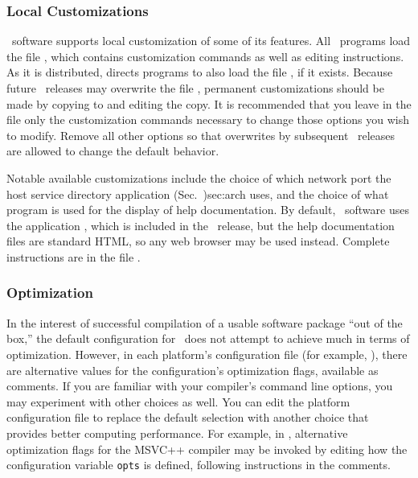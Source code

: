 \subsubsection{Local Customizations}\label{sec:custom}

\OOMMF\ software supports local customization of some of its
features.  All \OOMMF\ programs load the file
, which
contains customization commands as well as editing instructions.  As it
is distributed,  directs programs to also load
the file , if it exists.  Because future
\OOMMF\ releases may overwrite the file
, permanent customizations should be made by
copying  to  and
editing the copy.  It is recommended that you leave in the file
 only the customization commands necessary
to change those options you wish to modify.  Remove all other options so
that overwrites by subsequent \OOMMF\ releases are allowed to change the
default behavior.

Notable available customizations include the choice of which network
port the  {host service
directory application (Sec.~}{)}{sec:arch} uses, and the choice of what
program is used for the display of help documentation.  By default, 
\OOMMF\ software uses the application
, which
is included in the \OOMMF\ release, but the help documentation files
are standard HTML, so any web browser 
may be used instead.  Complete
instructions are in the file .

\subsubsection{Optimization}\label{sec:optimize}

In the interest of successful compilation of a usable software package
``out of the box,'' the default configuration for \OOMMF\ does not
attempt to achieve much in terms of optimization.  However, in each
platform's configuration file (for example,
), there are alternative values for the
configuration's optimization flags, available as comments.  If you are
familiar with your compiler's command line options, you may experiment
with other choices as well.  You can edit the platform configuration
file to replace the default selection with another choice that
provides better computing performance.  For example, in
, alternative optimization flags for the
MSVC++ compiler may be invoked by editing how the configuration
variable {\tt opts} is defined, following instructions in the comments.

